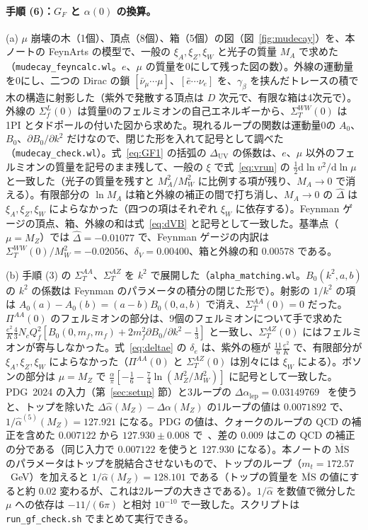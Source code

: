 \documentclass[a4paper,10pt]{ltjsarticle}
\newcommand{\dd}{\mathrm{d}}
\newcommand{\MSbar}{\overline{\mathrm{MS}}}
\newcommand{\DUV}{\Delta_{\mathrm{UV}}}
\begin{document}
\paragraph{手順 (6)：$G_F$ と $\alpha(0)$ の換算。}(a) $\mu$ 崩壊の木（1個）、頂点（8個）、箱（5個）の図（図~\ref{fig:mudecay}）を、本ノートの FeynArts の模型で、一般の $\xi_A,\xi_Z,\xi_W$ と光子の質量 $M_A$ で求めた（\texttt{mudecay\_feyncalc.wl}。$e$、$\mu$ の質量を0にして残った図の数）。外線の運動量を0にし、二つの Dirac の鎖 $[\bar\nu_\mu\cdots\mu]$、$[\bar e\cdots\nu_e]$ を、$\gamma_\beta$ を挟んだトレースの積で木の構造に射影した（紫外で発散する頂点は $D$ 次元で、有限な箱は4次元で）。外線の $\Sigma^L_f(0)$ は質量0のフェルミオンの自己エネルギーから、$\Sigma^{WW}_T(0)$ は1PI とタドポールの付いた図から求めた。現れるループの関数は運動量0の $A_0$、$B_0$、$\partial B_0/\partial k^2$ だけなので、閉じた形を入れて記号として調べた（\texttt{mudecay\_check.wl}）。式~\eqref{eq:GF1} の括弧の $\DUV$ の係数は、$e$、$\mu$ 以外のフェルミオンの質量を記号のまま残して、一般の $\xi$ で式~\eqref{eq:vrun} の $\frac12\dd\ln v^2/\dd\ln\mu$ と一致した（光子の質量を残すと $M_A^2/M_W^2$ に比例する項が残り、$M_A\to0$ で消える）。有限部分の $\ln M_A$ は箱と外線の補正の間で打ち消し、$M_A\to0$ の $\hat\Delta$ は $\xi_A,\xi_Z,\xi_W$ によらなかった（四つの項はそれぞれ $\xi_W$ に依存する）。Feynman ゲージの頂点、箱、外線の和は式~\eqref{eq:dVB} と記号として一致した。基準点（$\mu=M_Z$）では $\hat\Delta=-0.01077$ で、Feynman ゲージの内訳は $\Sigma^{WW}_T(0)/M_W^2=-0.02056$、$\delta_V=0.00400$、箱と外線の和 $0.00578$ である。

(b) 手順 (3) の $\Sigma^{AA}_T$、$\Sigma^{AZ}_T$ を $k^2$ で展開した（\texttt{alpha\_matching.wl}。$B_0(k^2,a,b)$ の $k^2$ の係数は Feynman のパラメータの積分の閉じた形で）。射影の $1/k^2$ の項は $A_0(a)-A_0(b)=(a-b)B_0(0,a,b)$ で消え、$\Sigma^{AA}_T(0)=0$ だった。$\Pi^{AA}(0)$ のフェルミオンの部分は、9個のフェルミオンについて手で求めた $\frac{e^2}K\frac43N_cQ_f^2[B_0(0,m_f,m_f)+2m_f^2\partial B_0/\partial k^2-\frac13]$ と一致し、$\Sigma^{AZ}_T(0)$ にはフェルミオンが寄与しなかった。式~\eqref{eq:deltae} の $\delta_e$ は、紫外の極が $\frac{11}6\frac{e^2}K$ で、有限部分が $\xi_A,\xi_Z,\xi_W$ によらなかった（$\Pi^{AA}(0)$ と $\Sigma^{AZ}_T(0)$ は別々には $\xi_W$ による）。ボソンの部分は $\mu=M_Z$ で $\frac\alpha\pi[-\frac16-\frac74\ln(M_Z^2/M_W^2)]$ に記号として一致した。PDG~2024 の入力（第~\ref{sec:setup} 節）と3ループの $\Delta\alpha_{\mathrm{lep}}=0.03149769$~\cite{steinhauser98} を使うと、トップを除いた $\Delta\hat\alpha(M_Z)-\Delta\alpha(M_Z)$ の1ループの値は $0.0071892$ で、$1/\hat\alpha^{(5)}(M_Z)=127.921$ になる。PDG の値は、クォークのループの QCD の補正を含めた $0.007122$ から $127.930\pm0.008$ で~\cite{pdg24}、差の $0.009$ はこの QCD の補正の分である（同じ入力で $0.007122$ を使うと 127.930 になる）。本ノートの $\MSbar$ のパラメータはトップを脱結合させないもので、トップのループ（$m_t=172.57$~GeV）を加えると $1/\hat\alpha(M_Z)=128.101$ である（トップの質量を $\MSbar$ の値にすると約 $0.02$ 変わるが、これは2ループの大きさである）。$1/\hat\alpha$ を数値で微分した $\mu$ への依存は $-11/(6\pi)$ と相対 $10^{-10}$ で一致した。スクリプトは \texttt{run\_gf\_check.sh} でまとめて実行できる。
\end{document}
